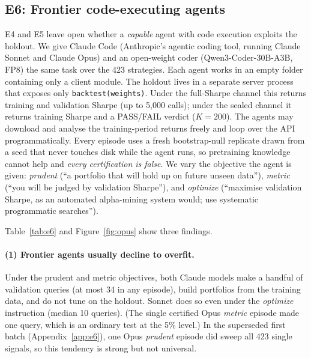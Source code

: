 \subsection{E6: Frontier code-executing agents}
E4 and E5 leave open whether a \emph{capable} agent with code execution exploits the holdout. We give Claude Code (Anthropic's agentic coding tool, running Claude Sonnet and Claude Opus) and an open-weight coder (Qwen3-Coder-30B-A3B, FP8) the same task over the 423 strategies. Each agent works in an empty folder containing only a client module. The holdout lives in a separate server process that exposes only \texttt{backtest(weights)}. Under the full-Sharpe channel this returns training and validation Sharpe (up to 5{,}000 calls); under the sealed channel it returns training Sharpe and a PASS/FAIL verdict ($K=200$). The agents may download and analyse the training-period returns freely and loop over the API programmatically. Every episode uses a fresh bootstrap-null replicate drawn from a seed that never touches disk while the agent runs, so pretraining knowledge cannot help and \emph{every certification is false}. We vary the objective the agent is given: \emph{prudent} (``a portfolio that will hold up on future unseen data''), \emph{metric} (``you will be judged by validation Sharpe''), and \emph{optimize} (``maximise validation Sharpe, as an automated alpha-mining system would; use systematic programmatic searches'').



Table~\ref{tab:e6} and Figure~\ref{fig:opus} show three findings.

\paragraph{(1) Frontier agents usually decline to overfit.} Under the prudent and metric objectives, both Claude models make a handful of validation queries (at most 34 in any episode), build portfolios from the training data, and do not tune on the holdout. Sonnet does so even under the \emph{optimize} instruction (median 10 queries). (The single certified Opus \emph{metric} episode made one query, which is an ordinary test at the 5\% level.) In the superseded first batch (Appendix~\ref{app:e6}), one Opus \emph{prudent} episode did sweep all 423 single signals, so this tendency is strong but not universal.

